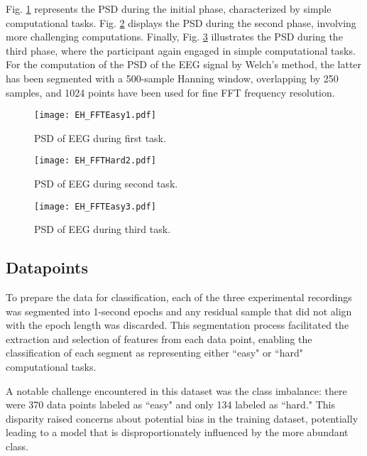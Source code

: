 \documentclass[conference]{IEEEtran}
\begin{document}
Fig. \ref{figPSD1} represents the PSD during the initial phase, characterized by simple computational tasks. Fig. \ref{figPSD2} displays the PSD during the second phase, involving more challenging computations. Finally, Fig. \ref{figPSD3} illustrates the PSD during the third phase, where the participant again engaged in simple computational tasks. 
For the computation of the PSD of the EEG signal by Welch’s method, the latter has been segmented with a 500-sample Hanning window, overlapping by 250 samples, and 1024 points have been used for fine FFT frequency resolution.

\begin{figure}[htbp]
\centerline{\texttt{[image: EH\_FFTEasy1.pdf]}}
\caption{PSD of EEG during first task.}
\label{figPSD1}
\end{figure}

\begin{figure}[htbp]
\centerline{\texttt{[image: EH\_FFTHard2.pdf]}}
\caption{PSD of EEG during second task.}
\label{figPSD2}
\end{figure}

\begin{figure}[htbp]
\centerline{\texttt{[image: EH\_FFTEasy3.pdf]}}
\caption{PSD of EEG during third task.}
\label{figPSD3}
\end{figure}



\newpage
\subsection{Datapoints}

To prepare the data for classification, each of the three experimental recordings was segmented into 1-second epochs and any residual sample that did not align with the epoch length was discarded. This segmentation process facilitated the extraction and selection of features from each data point, enabling the classification of each segment as representing either ``easy" or ``hard" computational tasks. 

A notable challenge encountered in this dataset was the class imbalance: there were 370 data points labeled as ``easy" and only 134 labeled as ``hard." This disparity raised concerns about potential bias in the training dataset, potentially leading to a model that is disproportionately influenced by the more abundant class.

\end{document}
